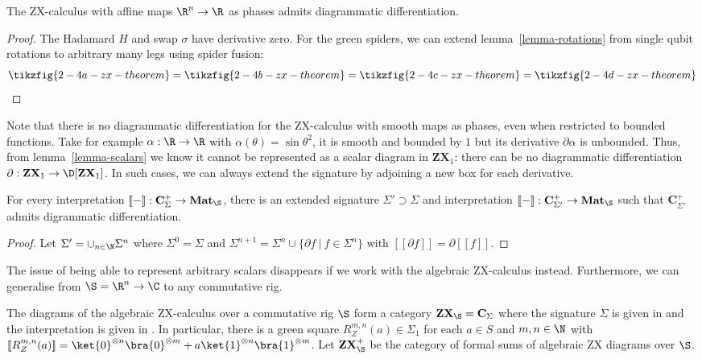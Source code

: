 \begin{theorem}\label{theorem-zx-diag-diff}
The ZX-calculus with affine maps $\R^n \to \R$ as phases admits diagrammatic
differentiation.
\end{theorem}

\begin{proof}
The Hadamard $H$ and swap $\sigma$ have derivative zero.
For the green spiders, we can extend lemma~\ref{lemma-rotations} from
single qubit rotations to arbitrary many legs using spider fusion:
$$\tikzfig{2-4a-zx-theorem}
= \tikzfig{2-4b-zx-theorem}
= \tikzfig{2-4c-zx-theorem}
= \tikzfig{2-4d-zx-theorem}$$
\end{proof}

Note that there is no diagrammatic differentiation for the ZX-calculus with
smooth maps as phases, even when restricted to bounded functions.
Take for example $\alpha : \R \to \R$ with $\alpha(\theta) = \sin \theta^2$,
it is smooth and bounded by $1$ but its derivative $\partial \alpha$ is
unbounded.
Thus, from lemma~\ref{lemma-scalars} we know it cannot be represented as a
scalar diagram in $\mathbf{ZX}_1$: there can be no diagrammatic
differentiation $\partial : \mathbf{ZX}_1 \to \D[\mathbf{ZX}_1]$.
In such cases, we can always extend the signature by adjoining a new box
for each derivative.

\begin{proposition}
For every interpretation $[\![-]\!] : \mathbf{C}_\Sigma^+ \to \mathbf{Mat}_\S$,
there is an extended signature $\Sigma' \supset \Sigma$
and interpretation $[\![-]\!] : \mathbf{C}_{\Sigma'}^+ \to \mathbf{Mat}_\S$
such that $\mathbf{C}_{\Sigma'}^+$ admits digrammatic differentiation.
\end{proposition}

\begin{proof}
Let $\Sigma' = \cup_{n \in \N} \Sigma^n$ where $\Sigma^0 = \Sigma$
and $\Sigma^{n + 1} = \Sigma^n \cup \{ \partial f \ \vert \ f \in \Sigma^n \}$
with $[\![\partial f]\!] = \partial [\![f]\!]$.
\end{proof}

The issue of being able to represent arbitrary scalars disappears if we work
with the algebraic ZX-calculus instead. Furthermore, we can generalise
from $\S = \R^n \to \C$ to any commutative rig.

\begin{definition}
The diagrams of the algebraic ZX-calculus over a commutative rig $\S$ form a
category $\mathbf{ZX}_\S = \mathbf{C}_\Sigma$ where the signature $\Sigma$ is
given in \cite[Table 2]{Wang20} and the interpretation
is given in \cite[§6]{Wang20}.
In particular, there is a green square $R_Z^{m, n}(a) \in \Sigma_1$ for each $a \in S$
and $m, n \in \N$ with $[\![R_Z^{m, n}(a)]\!] =
\ket{0}^{\otimes n} \bra{0}^{\otimes m}
+ a \ket{1}^{\otimes n} \bra{1}^{\otimes m}$.
Let $\mathbf{ZX}_\S^+$ be the category of formal sums of algebraic ZX
diagrams over $\S$.
\end{definition}

